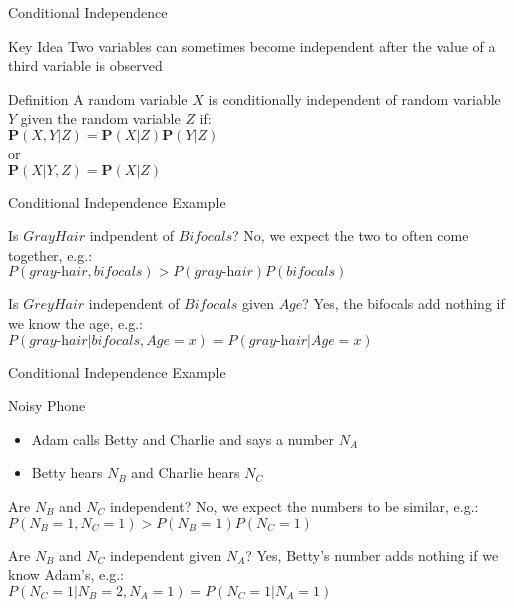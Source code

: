 \documentclass[14pt]{beamer}
\begin{document}
\begin{frame}{Conditional Independence}
	\begin{block}{Key Idea}
		Two variables can sometimes become independent after the value of a third variable is observed
	\end{block}
	\begin{block}{Definition}
		A random variable $X$ is \alert{conditionally independent} of random variable $Y$ given the random variable $Z$ if: \\
		\tab$\mathbf{P}(X,Y|Z) = \mathbf{P}(X|Z)\mathbf{P}(Y|Z)$ \\
		or \\
		\tab$\mathbf{P}(X|Y,Z) = \mathbf{P}(X|Z)$
	\end{block}
\end{frame}

\begin{frame}{Conditional Independence Example}
\begin{block}{Is $\textit{GrayHair}$ indpendent of $\textit{Bifocals}$?}
\pause
No, we expect the two to often come together, e.g.: \\[.5em]
$P(\textit{gray-hair}, \textit{bifocals}) > P(\textit{gray-hair})P(\textit{bifocals})$
\end{block}
\pause
\begin{block}{Is $\textit{GreyHair}$ independent of $\textit{Bifocals}$ given $\textit{Age}$?}
\pause
Yes, the bifocals add nothing if we know the age, e.g.: \\[.5em]
$P(\textit{gray-hair}|\textit{bifocals},\textit{Age}\!=\!x) = P(\textit{gray-hair}|\textit{Age}\!=\!x)$
\end{block}
\end{frame}

\begin{frame}{Conditional Independence Example}
\begin{block}{Noisy Phone}
\begin{itemize}
\item Adam calls Betty and Charlie and says a number $N_{A}$
\item Betty hears $N_{B}$ and Charlie hears $N_{C}$
\end{itemize}
\end{block}
\pause
\begin{block}{Are $N_{B}$ and $N_{C}$ independent?}
\pause
No, we expect the numbers to be similar, e.g.: \\[.5em]
$P(N_{B}=1, N_{C}=1) > P(N_{B}=1)P(N_{C}=1)$
\end{block}
\pause
\begin{block}{Are $N_{B}$ and $N_{C}$ independent given $N_{A}$?}
\pause
Yes, Betty's number adds nothing if we know Adam's, e.g.: \\[.5em]
$P(N_{C}=1|N_{B}=2,N_{A}=1) = P(N_{C}=1|N_{A}=1)$
\end{block}
\end{frame}
\end{document}
